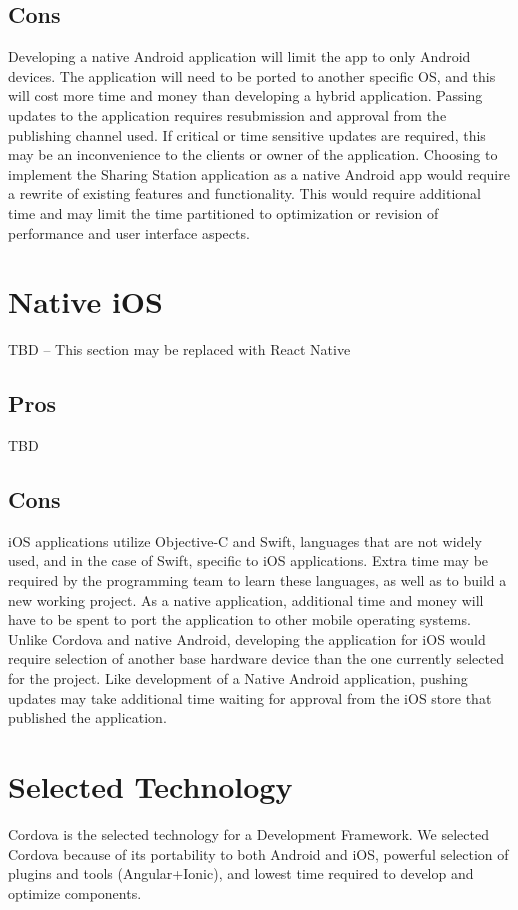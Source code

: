 \documentclass[letterpaper,10pt,draftclsnofoot,onecolumn]{IEEEtran}
\begin{document}
\subsection*{Cons}
Developing a native Android application will limit the app to only Android devices. The application will need to be ported to another specific OS, and this will cost more time and money than developing a hybrid application.
Passing updates to the application requires resubmission and approval from the publishing channel used. If critical or time sensitive updates are required, this may be an inconvenience to the clients or owner of the application.
Choosing to implement the Sharing Station application as a native Android app would require a rewrite of existing features and functionality. This would require additional time and may limit the time partitioned to optimization or revision of performance and user interface aspects.
\section*{Native iOS}
TBD – This section may be replaced with React Native
\subsection*{Pros}
TBD
\subsection*{Cons}
iOS applications utilize Objective-C and Swift, languages that are not widely used, and in the case of Swift, specific to iOS applications. Extra time may be required by the programming team to learn these languages, as well as to build a new working project.
As a native application, additional time and money will have to be spent to port the application to other mobile operating systems. Unlike Cordova and native Android, developing the application for iOS would require selection of another base hardware device than the one currently selected for the project.
Like development of a Native Android application, pushing updates may take additional time waiting for approval from the iOS store that published the application.
\section*{Selected Technology}
Cordova is the selected technology for a Development Framework. We selected Cordova because of its portability to both Android and iOS, powerful selection of plugins and tools (Angular+Ionic), and lowest time required to develop and optimize components.
\end{document}
